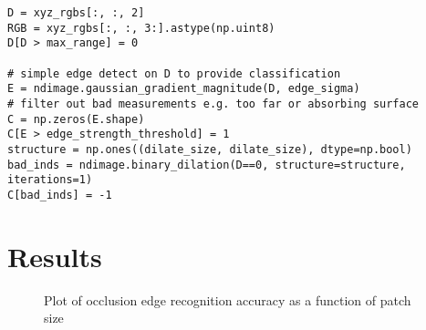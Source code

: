 \documentclass{article} %
\begin{document}
\begin{verbatim}
D = xyz_rgbs[:, :, 2]
RGB = xyz_rgbs[:, :, 3:].astype(np.uint8)
D[D > max_range] = 0

# simple edge detect on D to provide classification
E = ndimage.gaussian_gradient_magnitude(D, edge_sigma)
# filter out bad measurements e.g. too far or absorbing surface
C = np.zeros(E.shape)
C[E > edge_strength_threshold] = 1
structure = np.ones((dilate_size, dilate_size), dtype=np.bool)
bad_inds = ndimage.binary_dilation(D==0, structure=structure, iterations=1)
C[bad_inds] = -1
\end{verbatim}

\section{Results}

\begin{figure}
    \vspace{2in}
    \caption{Plot of occlusion edge recognition accuracy as a function of patch size}
\end{figure}
\end{document}
